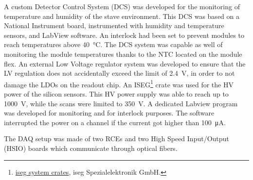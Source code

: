 A custom Detector Control System (DCS) was developed for the monitoring of temperature and humidity of the stave environment. This DCS was based on a National Instrument board\cite{NIboard}, instrumented with humidity and temperature sensors, and LabView software. An interlock had been set to prevent modules to reach temperatures above \SI{40}{\celsius}.
The DCS system was capable as well of monitoring the module temperatures thanks to the NTC located on the module flex.
An external Low Voltage regulator system was developed to ensure that the LV regulation does not accidentally exceed the limit of \SI{2.4}{\volt}, in order to not damage the LDOs on the readout chip. An ISEG\footnote{\href{http://www.iseg-hv.com/products/crates/}{iseg system crates}, iseg Spezialelektronik GmbH.} crate was used for the HV power of the silicon sensors. This HV power supply was able to reach up to 1000~V, while the scans were limited to \SI{350}{\volt}. A dedicated Labview program was developed for monitoring and for interlock purposes. The software interrupted the power on a channel if the current got higher than \SI{100}{\micro\ampere}.

The DAQ setup was made of two RCEs and two High Speed Input/Output (HSIO)\cite{RCE} boards which communicate through optical fibers.


